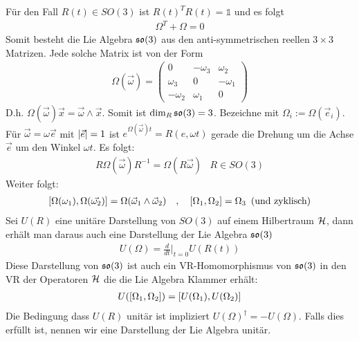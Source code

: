 Für den Fall $R(t) \in SO(3)$ ist $R(t)^T R(t) = \mathds{1}$ und es folgt
\begin{align*}
    \Omega^T + \Omega = 0
\end{align*}
Somit besteht die Lie Algebra $\mathfrak{so}(3)$ aus den anti-symmetrischen reellen
$3 \times 3$ Matrizen. Jede solche Matrix ist von der Form
\begin{align*}
    \Omega(\vec{\omega}) = \begin{pmatrix}
        0 & -\omega_3 & \omega_2 \\
        \omega_3 & 0 & -\omega_1 \\
        -\omega_2 & \omega_1 & 0
    \end{pmatrix}
\end{align*}
D.h. $\Omega(\vec{\omega}) \vec{x} = \vec{\omega} \wedge \vec{x}$. Somit
ist $\dim_{R} \mathfrak{so}(3) = 3$. Bezeichne mit $\Omega_i := \Omega(\vec{e}_i)$.
Für $\vec{\omega} = \omega \vec{e}$ mit $\left\vert \vec{e} \right\vert=1$
ist $e^{\Omega(\vec{\omega}) t} = R(e,\omega t)$ gerade die Drehung um die Achse
$\vec{e}$ um den Winkel $\omega t$. Es folgt:
\begin{align*}
    R \Omega(\vec{\omega}) R^{-1} = \Omega(R \vec{\omega})
    \hspace{10pt}
    R \in SO(3)
\end{align*}
Weiter folgt:
\begin{align*}
    \left[ \Omega(\omega_1),\Omega(\vec{\omega_2}) \right] =
    \Omega(\vec{\omega}_1 \wedge \vec{\omega}_2)
    \hspace{10pt} , \hspace{10pt}
    \left[ \Omega_1,\Omega_2 \right] = \Omega_3 \hspace{5pt}
    \text{(und zyklisch)}
\end{align*}
Sei $U(R)$ eine unitäre Darstellung von $SO(3)$ auf einem Hilbertraum $\mathcal{H}$, dann
erhält man daraus auch eine Darstellung der Lie Algebra $\mathfrak{so}(3)$
\begin{align*}
    U(\Omega) = \frac{d}{dt} \Big|_{t=0} U(R(t))
\end{align*}
Diese Darstellung von $\mathfrak{so}(3)$ ist auch ein VR-Homomorphismus von $\mathfrak{so}(3)$ in den
VR der Operatoren $\mathcal{H}$ die die Lie Algebra Klammer erhält:
\begin{align*}
    U(\left[ \Omega_1,\Omega_2 \right]) = \left[ U(\Omega_1),U(\Omega_2) \right]
\end{align*}
Die Bedingung dass $U(R)$ unitär ist impliziert $U(\Omega)^\dagger = - U(\Omega)$.
Falls dies erfüllt ist, nennen wir eine Darstellung der Lie Algebra unitär. 

